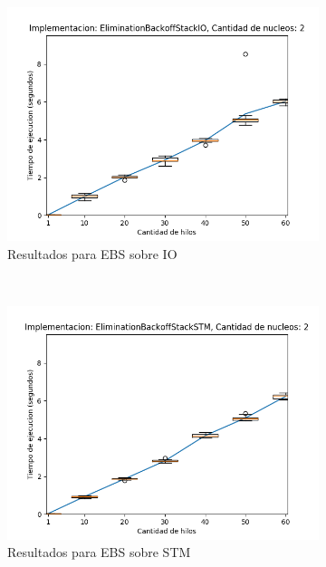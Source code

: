 \begin{figure}[t]
    \centering
    \begin{subfigure}[b]{0.49\textwidth}
        \includegraphics[width=\textwidth]{images/numberOfThreads/plots/expEBSIO-2}
        \caption{Resultados para EBS sobre IO}
        \label{subfig:numberOfThreads-ebsio-2}
    \end{subfigure}
    ~
    \begin{subfigure}[b]{0.49\textwidth}
        \includegraphics[width=\textwidth]{images/numberOfThreads/plots/expEBSSTM-2}
        \caption{Resultados para EBS sobre STM}
        \label{subfig:numberOfThreads-ebsstm-2}
    \end{subfigure}
    \begin{subfigure}[b]{0.49\textwidth}

\end{subfigure}
\end{figure}
